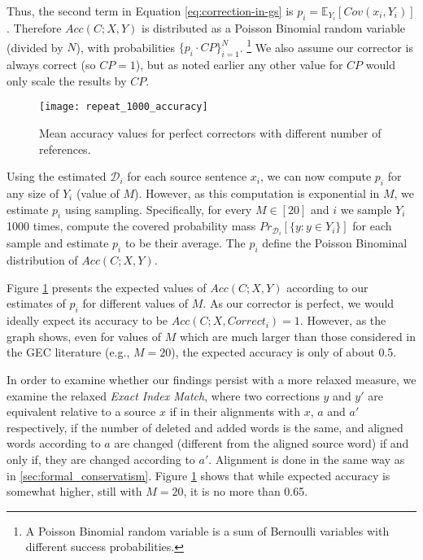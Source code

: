 		Thus, the second
		term in Equation \ref{eq:correction-in-gs} is $p_i = \mathbb{E}_{Y_i}[Cov(x_i,Y_i)]$. Therefore $Acc(C;X,Y)$ is distributed as
		a Poisson Binomial random variable (divided by $N$), with probabilities $\{p_i \cdot CP\}_{i=1}^N$. \footnote{A Poisson Binomial random variable is a sum of Bernoulli variables with different success probabilities.} We also assume our corrector is always correct (so $CP=1$), but as noted earlier any other value for $CP$ would only scale the results by $CP$.
		
		\begin{figure}
			\texttt{[image: repeat\_1000\_accuracy]}
			\caption{Mean accuracy values for perfect correctors with different number of references.} \label{fig:accuracy_vals}
		\end{figure}
		
		Using the estimated $\mathcal{D}_i$ for each source sentence $x_i$, we can now compute $p_i$ for any
		size of $Y_i$ (value of $M$). However, as this computation is exponential in $M$, we estimate $p_i$ using
		sampling. Specifically, for every $M\in[20]$ and $i$ we sample $Y_i$ 1000 times, compute 
		the covered probability mass $Pr_{\mathcal{D}_i}[\{y: y \in Y_i\}]$ for each sample and estimate $p_i$ to be their
		average. The $p_i$ define the Poisson Binominal distribution of $Acc(C;X,Y)$.
		
		Figure \ref{fig:accuracy_vals} presents the expected values of $Acc(C;X,Y)$ according to our estimates of $p_i$ for
		different values of $M$. As our corrector is perfect, we would ideally expect its accuracy to be
		$Acc(C;X,Correct_i) = 1$. However, as the graph shows, even for values of $M$ which are much larger than
		those considered in the GEC literature (e.g., $M=20$), the expected accuracy is only of about 0.5.
		
		In order to examine whether our findings persist with a more relaxed measure, we examine the relaxed
		{\it Exact Index Match}, where two corrections $y$ and $y'$
		are equivalent relative to a source $x$ if in their alignments with $x$, $a$ and $a'$ respectively,
		if the number of deleted and added words is the same, and aligned words according to $a$ are
		changed (different from the aligned source word) if and only if, they are changed according to $a'$. Alignment is done in the same way as in \ref{sec:formal_conservatism}. Figure \ref{fig:accuracy_vals}
		shows that while expected accuracy is somewhat higher, still with $M=20$, it is no more than 0.65.
		
